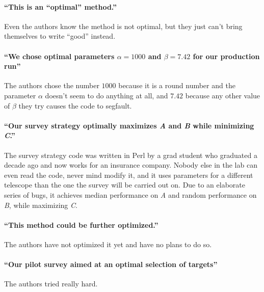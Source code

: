 \documentclass[12pt, preprint]{aastex}
\begin{document}
\paragraph{``This is an ``optimal'' method.''}
Even the authors know the method is not optimal, but they just can't bring
themselves to write ``good'' instead.

\paragraph{``We chose optimal parameters $\alpha=1000$ and $\beta=7.42$
  for our production run''} The authors chose the number $1000$ because
it is a round number and the parameter $\alpha$ doesn't seem to do
anything at all, and $7.42$ because any other value of $\beta$ they
try causes the code to segfault.

\paragraph{``Our survey strategy optimally maximizes \emph{A} and \emph{B} while minimizing \emph{C}.''}
The survey strategy code was written in Perl by a grad student who
graduated a decade ago and now works for an insurance company.  Nobody
else in the lab can even read the code, never mind modify it, and it
uses parameters for a different telescope than the one the survey will
be carried out on.  Due to an elaborate series of bugs, it achieves
median performance on \emph{A} and random performance on \emph{B},
while maximizing \emph{C}.


\paragraph{``This method could be further optimized.''}
The authors have not optimized it yet and have no plans to do so.


\paragraph{``Our pilot survey aimed at an optimal selection of targets''}
The authors tried really hard.
\end{document}
